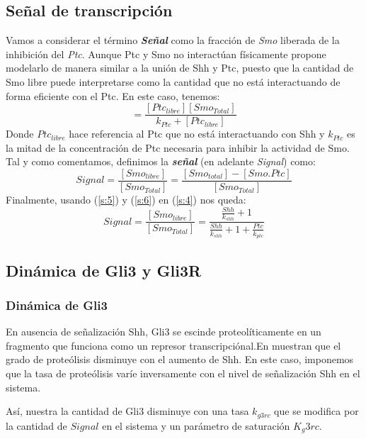  \subsection{Señal de transcripción}
 Vamos a considerar el término \textbf{\textit{Señal}} como la fracción de \textit{Smo} liberada de la inhibición del \textit{Ptc}. Aunque Ptc y Smo no interactúan físicamente \cite{schaffer} propone modelarlo de manera similar a la unión de Shh y Ptc, puesto que la cantidad de Smo libre puede interpretarse como la cantidad que no está interactuando de forma eficiente con el Ptc.
 En este caso, tenemos:
 \begin{equation}
 [Shh.Ptc]=\frac{[Ptc_{libre}][Smo_{Total}]}{k_{Ptc}+[Ptc_{libre}]}
 \label{s:5}
 \end{equation}
 Donde $Ptc_{libre}$ hace referencia al Ptc que no está interactuando con Shh y $k_{Ptc}$ es la mitad de la concentración de Ptc necesaria para inhibir la actividad de Smo.
 Tal y como comentamos, definimos la \textbf{\textit{señal}} (en adelante \textit{Signal}) como:
 \begin{equation}
 Signal=\frac{[Smo_{libre}]}{[Smo_{Total}]}=\frac{[Smo_{total}]-[Smo.Ptc]}{[Smo_{Total}]}
 \label{s:4}
 \end{equation}
 Finalmente, usando (\ref{s:5}) y (\ref{s:6}) en (\ref{s:4}) nos queda:
 \begin{equation}
 Signal=\frac{[Smo_{libre}]}{[Smo_{Total}]}=\frac{\frac{Shh}{k_{shh}} + 1}{\frac{Shh}{k_{shh}} + 1 + \frac{Ptc}{k_{ptc}}}
 \label{s:7}
 \end{equation}
 
 \subsection{Dinámica de Gli3 y Gli3R}
 \subsubsection{Dinámica de Gli3}
 En ausencia de señalización Shh, Gli3 se escinde proteolíticamente en un fragmento que funciona como un
 represor transcripciónal.En \cite{wang2000hedgehog} muestran que el grado de proteólisis disminuye con el aumento de Shh. En este caso, imponemos que la tasa de proteólisis varíe inversamente con el nivel de señalización Shh en el sistema.
 
 Así, nuestra la cantidad de Gli3 disminuye con una tasa $k_{g3rc}$ que se modifica por la cantidad de $Signal$ en el sistema y un parámetro de saturación $K_g3rc$.
 
